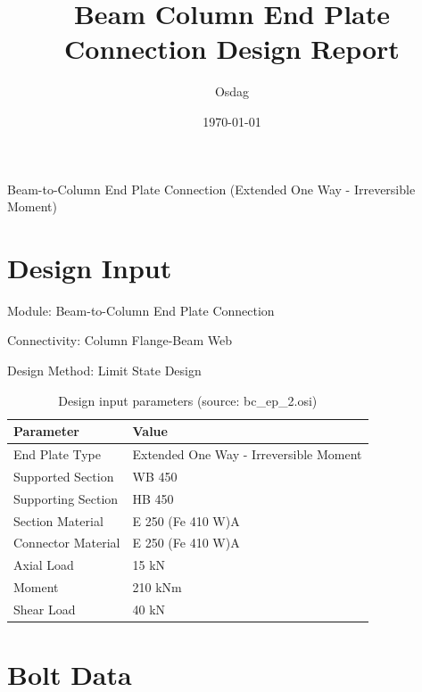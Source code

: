 \documentclass[12pt]{article}
\title{\textbf{Beam Column End Plate Connection Design Report}}
\author{Osdag}
\date{\today}
\begin{document}
\maketitle


\vspace{0.5cm}
\centerline{\large {Beam-to-Column End Plate Connection (Extended One Way - Irreversible Moment)}}
\vspace{1cm}



\tableofcontents
\newpage



\listoffigures
\newpage



\listoftables
\newpage


\section{Design Input}

Module: Beam-to-Column End Plate Connection

Connectivity: Column Flange-Beam Web

Design Method: Limit State Design

\begin{table}[h]
\centering
\caption{Design input parameters (source: bc\_ep\_2.osi)}
\label{tab:input}
\begin{tabular}{ll}
Parameter & Value \\ \hline
End Plate Type & Extended One Way - Irreversible Moment \\
\hline
Supported Section & WB 450 \\
\hline
Supporting Section & HB 450 \\
\hline
Section Material & E 250 (Fe 410 W)A \\
\hline
Connector Material & E 250 (Fe 410 W)A \\
\hline
Axial Load & 15 kN \\
\hline
Moment & 210 kNm \\
\hline
Shear Load & 40 kN \\
\hline
\end{tabular}
\end{table}

\FloatBarrier

\section{Bolt Data}
\end{document}
